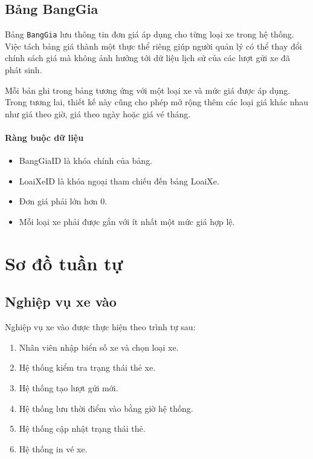 \subsection{Bảng BangGia}

Bảng \texttt{BangGia} lưu thông tin đơn giá áp dụng cho từng loại xe
trong hệ thống. Việc tách bảng giá thành một thực thể riêng giúp
người quản lý có thể thay đổi chính sách giá mà không ảnh hưởng tới
dữ liệu lịch sử của các lượt gửi xe đã phát sinh.

Mỗi bản ghi trong bảng tương ứng với một loại xe và mức giá được
áp dụng. Trong tương lai, thiết kế này cũng cho phép mở rộng thêm
các loại giá khác nhau như giá theo giờ, giá theo ngày hoặc giá
vé tháng.

\paragraph{Ràng buộc dữ liệu}

\begin{itemize}
    \item BangGiaID là khóa chính của bảng.

    \item LoaiXeID là khóa ngoại tham chiếu đến bảng LoaiXe.

    \item Đơn giá phải lớn hơn 0.

    \item Mỗi loại xe phải được gắn với ít nhất một mức giá hợp lệ.
\end{itemize}


\section{Sơ đồ tuần tự}

\subsection{Nghiệp vụ xe vào}

Nghiệp vụ xe vào được thực hiện theo trình tự sau:

\begin{enumerate}
    \item Nhân viên nhập biển số xe và chọn loại xe.
    \item Hệ thống kiểm tra trạng thái thẻ xe.
    \item Hệ thống tạo lượt gửi mới.
    \item Hệ thống lưu thời điểm vào bằng giờ hệ thống.
    \item Hệ thống cập nhật trạng thái thẻ.
    \item Hệ thống in vé xe.
\end{enumerate}

